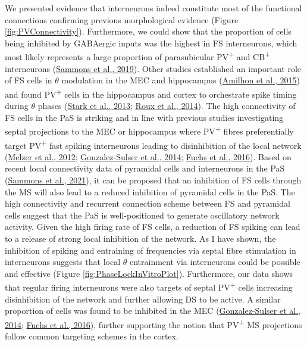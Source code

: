 \documentclass[
  12pt,
  a4paper,
  openany]{book}
\begin{document}
We presented evidence that interneurons indeed constitute most of the functional connections confirming previous morphological evidence (Figure \ref{fig:PVConnectivity}). Furthermore, we could show that the proportion of cells being inhibited by GABAergic inputs was the highest in FS interneurons, which most likely represents a large proportion of parasubicular PV\textsuperscript{+} and CB\textsuperscript{+} interneurons (\protect\hyperlink{ref-sammons_electrophysiological_2019}{Sammons et al., 2019}). Other studies established an important role of FS cells in \(\theta\) modulation in the MEC and hippocampus (\protect\hyperlink{ref-amilhon_parvalbumin_2015}{Amilhon et al., 2015}) and found PV\textsuperscript{+} cells in the hippocampus and cortex to orchestrate spike timing during \(\theta\) phases (\protect\hyperlink{ref-stark_inhibition-induced_2013}{Stark et al., 2013}; \protect\hyperlink{ref-roux_vivo_2014}{Roux et al., 2014}). The high connectivity of FS cells in the PaS is striking and in line with previous studies investigating septal projections to the MEC or hippocampus where PV\textsuperscript{+} fibres preferentially target PV\textsuperscript{+} fast spiking interneurons leading to disinhibition of the local network (\protect\hyperlink{ref-melzer_long-rangeprojecting_2012}{Melzer et al., 2012}; \protect\hyperlink{ref-gonzalez-sulser_gabaergic_2014}{Gonzalez-Sulser et al., 2014}; \protect\hyperlink{ref-fuchs_local_2016}{Fuchs et al., 2016}). Based on recent local connectivity data of pyramidal cells and interneurons in the PaS (\protect\hyperlink{ref-sammons_local_2021}{Sammons et al., 2021}), it can be proposed that an inhibition of FS cells through the MS will also lead to a reduced inhibition of pyramidal cells in the PaS. The high connectivity and recurrent connection scheme between FS and pyramidal cells suggest that the PaS is well-positioned to generate oscillatory network activity. Given the high firing rate of FS cells, a reduction of FS spiking can lead to a release of strong local inhibition of the network. As I have shown, the inhibition of spiking and entraining of frequencies via septal fibre stimulation in interneurons suggests that local \(\theta\) entrainment via interneurons could be possible and effective (Figure \ref{fig:PhaseLockInVitroPlot}). Furthermore, our data shows that regular firing interneurons were also targets of septal PV\textsuperscript{+} cells increasing disinhibition of the network and further allowing DS to be active. A similar proportion of cells was found to be inhibited in the MEC (\protect\hyperlink{ref-gonzalez-sulser_gabaergic_2014}{Gonzalez-Sulser et al., 2014}; \protect\hyperlink{ref-fuchs_local_2016}{Fuchs et al., 2016}), further supporting the notion that PV\textsuperscript{+} MS projections follow common targeting schemes in the cortex.
\end{document}
